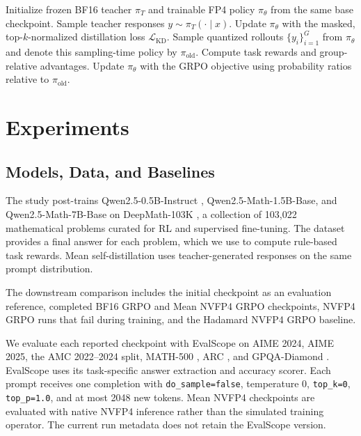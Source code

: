 \documentclass[letterpaper]{article}
\begin{document}
\begin{algorithm}[t]
\caption{Mean Self-Distillation Followed by FP4 GRPO}
\begin{algorithmic}[1]
\STATE Initialize frozen BF16 teacher $\pi_T$ and trainable FP4 policy $\pi_\theta$ from the same base checkpoint.
    \STATE Sample teacher responses $y\sim\pi_T(\cdot\mid x)$.
    \STATE Update $\pi_\theta$ with the masked, top-$k$-normalized distillation loss $\mathcal{L}_{\mathrm{KD}}$.
\ENDFOR
{}
    \STATE Sample quantized rollouts $\{y_i\}_{i=1}^{G}$ from $\pi_\theta$ and denote this sampling-time policy by $\pi_{\mathrm{old}}$.
    \STATE Compute task rewards and group-relative advantages.
    \STATE Update $\pi_\theta$ with the GRPO objective using probability ratios relative to $\pi_{\mathrm{old}}$.
\ENDFOR
\end{algorithmic}
\end{algorithm}

\FloatBarrier

\section{Experiments}

\subsection{Models, Data, and Baselines}

The study post-trains Qwen2.5-0.5B-Instruct \citep{yang2024qwen25}, Qwen2.5-Math-1.5B-Base, and Qwen2.5-Math-7B-Base \citep{yang2024qwen25math} on DeepMath-103K \citep{he2025deepmath}, a collection of 103,022 mathematical problems curated for RL and supervised fine-tuning. The dataset provides a final answer for each problem, which we use to compute rule-based task rewards. Mean self-distillation uses teacher-generated responses on the same prompt distribution.

The downstream comparison includes the initial checkpoint as an evaluation reference, completed BF16 GRPO and Mean NVFP4 GRPO checkpoints, NVFP4 GRPO runs that fail during training, and the Hadamard NVFP4 GRPO baseline.

We evaluate each reported checkpoint with EvalScope on AIME 2024, AIME 2025, the AMC 2022--2024 split, MATH-500 \citep{lightman2023letsverify}, ARC \citep{clark2018arc}, and GPQA-Diamond \citep{rein2023gpqa}. EvalScope uses its task-specific answer extraction and accuracy scorer. Each prompt receives one completion with \texttt{do\_sample=false}, temperature 0, \texttt{top\_k=0}, \texttt{top\_p=1.0}, and at most 2048 new tokens. Mean NVFP4 checkpoints are evaluated with native NVFP4 inference rather than the simulated training operator. The current run metadata does not retain the EvalScope version.
\end{document}
